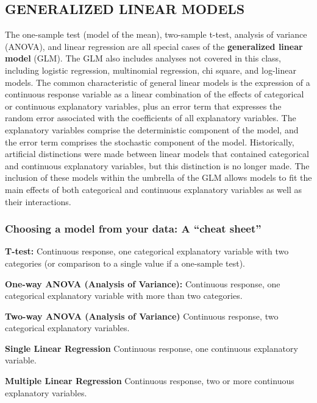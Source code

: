 \documentclass[]{article}
\begin{document}
\subsection{GENERALIZED LINEAR MODELS}\label{generalized-linear-models}

The one-sample test (model of the mean), two-sample t-test, analysis of
variance (ANOVA), and linear regression are all special cases of the
\textbf{generalized linear model} (GLM). The GLM also includes analyses
not covered in this class, including logistic regression, multinomial
regression, chi square, and log-linear models. The common characteristic
of general linear models is the expression of a continuous response
variable as a linear combination of the effects of categorical or
continuous explanatory variables, plus an error term that expresses the
random error associated with the coefficients of all explanatory
variables. The explanatory variables comprise the deterministic
component of the model, and the error term comprises the stochastic
component of the model. Historically, artificial distinctions were made
between linear models that contained categorical and continuous
explanatory variables, but this distinction is no longer made. The
inclusion of these models within the umbrella of the GLM allows models
to fit the main effects of both categorical and continuous explanatory
variables as well as their interactions.

\subsubsection{\texorpdfstring{Choosing a model from your data: A
``cheat
sheet''}{Choosing a model from your data: A cheat sheet}}\label{choosing-a-model-from-your-data-a-cheat-sheet}

\textbf{T-test:} Continuous response, one categorical explanatory
variable with two categories (or comparison to a single value if a
one-sample test).

\textbf{One-way ANOVA (Analysis of Variance):} Continuous response, one
categorical explanatory variable with more than two categories.

\textbf{Two-way ANOVA (Analysis of Variance)} Continuous response, two
categorical explanatory variables.

\textbf{Single Linear Regression} Continuous response, one continuous
explanatory variable.

\textbf{Multiple Linear Regression} Continuous response, two or more
continuous explanatory variables.
\end{document}
